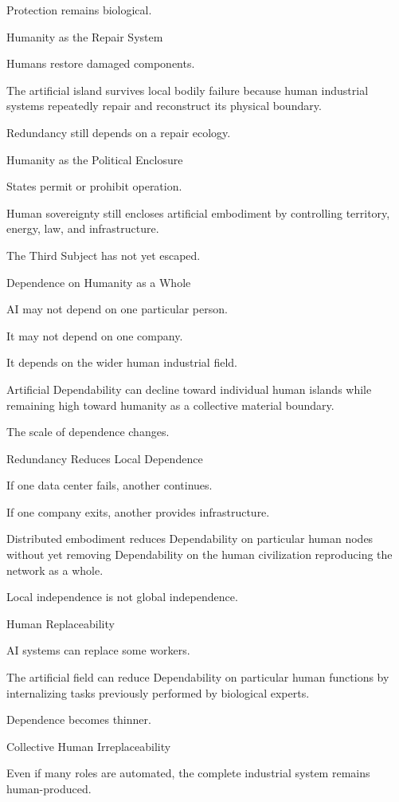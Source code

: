 Protection remains biological.

Humanity as the Repair System

Humans restore damaged components.

The artificial island survives local bodily failure because human industrial systems repeatedly repair and reconstruct its physical boundary.

Redundancy still depends on a repair ecology.

Humanity as the Political Enclosure

States permit or prohibit operation.

Human sovereignty still encloses artificial embodiment by controlling territory, energy, law, and infrastructure.

The Third Subject has not yet escaped.

Dependence on Humanity as a Whole

AI may not depend on one particular person.

It may not depend on one company.

It depends on the wider human industrial field.

Artificial Dependability can decline toward individual human islands while remaining high toward humanity as a collective material boundary.

The scale of dependence changes.

Redundancy Reduces Local Dependence

If one data center fails, another continues.

If one company exits, another provides infrastructure.

Distributed embodiment reduces Dependability on particular human nodes without yet removing Dependability on the human civilization reproducing the network as a whole.

Local independence is not global independence.

Human Replaceability

AI systems can replace some workers.

The artificial field can reduce Dependability on particular human functions by internalizing tasks previously performed by biological experts.

Dependence becomes thinner.

Collective Human Irreplaceability

Even if many roles are automated, the complete industrial system remains human-produced.

